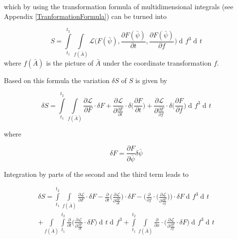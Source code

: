 \documentclass{article}
\DeclareMathOperator{\dd}{d\!}
\begin{document}
which by using the transformation formula of multidimensional integrals (see Appendix \ref{TranformationFormula}) can be turned into

\begin{equation}
S = \int\limits_{t_1}^{t_2} \int\limits_{f(\bar{A})} \mathcal{L}\bigg(F(\bar{\psi}), \frac{\partial F(\bar{\psi})}{\partial t}, \frac{\partial F(\bar{\psi})}{\partial f}\bigg) 
\dd f^3 \dd t 
\end{equation}
where $f(\bar{A})$ is the picture of $\bar{A}$ under the coordinate transformation $f$.

Based on this formula the variation $\delta S$ of $S$ is given by

\begin{equation}
\delta S = \int\limits_{t_1}^{t_2} \int\limits_{f(\bar{A})} 
\frac{\partial \mathcal{L}}{\partial F} \cdot \delta F
+ \frac{\partial \mathcal{L}}{\partial \frac{\partial F}{\partial t}} \cdot \delta \bigg(\frac{\partial F}{\partial t}\bigg)
+ \frac{\partial \mathcal{L}}{\partial \frac{\partial F}{\partial f}} \cdot \delta \bigg(\frac{\partial F} {\partial f}\bigg)
\dd f^3 \dd t
\end{equation}

where 

\begin{equation} \label{deltaFDefinition}
\delta F = \frac{\partial F}{\partial \bar{\psi}} \delta \bar{\psi}
\end{equation}


Integration by parts of the second and the third term leads to

\begin{equation} \label{calcDeltaSSection3}
\begin{split}
\delta S = \int\limits_{t_1}^{t_2} \int\limits_{f(\bar{A})} 
\frac{\partial \mathcal{L}}{\partial F} \cdot \delta F
-\frac{\partial}{\partial t} \bigg( \frac{\partial \mathcal{L}}{\partial \frac{\partial F}{\partial t}} \bigg) \cdot \delta F
-\bigg(\frac{\partial}{\partial f} \cdot \bigg( \frac{\partial \mathcal{L}}{\partial \frac{\partial F}{\partial f}} \bigg)\bigg) \cdot \delta F
\dd f^3 \dd t \\
+ \int\limits_{f(\bar{A})} \int\limits_{t_1}^{t_2} \frac{\partial}{\partial t} \bigg(\frac{\partial \mathcal{L}}{\partial \frac{\partial F}{\partial t}} \cdot \delta F \bigg) \dd t \dd f^3
+ \int\limits_{t_1}^{t_2} 
\int\limits_{f(\bar{A})} \frac{\partial}{\partial x} \cdot \bigg( \frac{\partial \mathcal{L}}{\partial \frac{\partial F}{\partial f}} \cdot \delta F \bigg) \dd f^3 \dd t
\end{split}
\end{equation}
\end{document}
